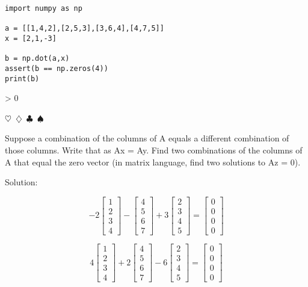 \documentclass{article}
\newcommand{\sep}{\begin{center}$\heartsuit$~$\diamondsuit$~$\clubsuit$~$\spadesuit$\end{center}}
\newcommand{\sol}{\begin{center}\small{Solution:}\end{center}}
\newcounter{prblm}
\newcommand{\problem}[1]{
  \begingroup
  \ifnum\value{prblm} > 0 \sep \fi
  \stepcounter{prblm}
  \noindent\textbf{\arabic{prblm}} #1
  \sol
  \endgroup
}
\begin{document}
\begin{verbatim}
import numpy as np

a = [[1,4,2],[2,5,3],[3,6,4],[4,7,5]]
x = [2,1,-3]

b = np.dot(a,x)
assert(b == np.zeros(4))
print(b)
\end{verbatim}


\problem{Suppose a combination of the columns of A equals a different combination of those columns. Write that as Ax = Ay. Find two combinations of the columns of A that
equal the zero vector (in matrix language, find two solutions to Az = 0).}


\begin{displaymath}
-2 \begin{bmatrix} 1 \\ 2 \\ 3 \\ 4 \end{bmatrix}
- \begin{bmatrix} 4 \\ 5 \\ 6 \\ 7 \end{bmatrix}
+ 3 \begin{bmatrix} 2 \\ 3 \\ 4 \\ 5 \end{bmatrix}
= \begin{bmatrix} 0 \\ 0 \\ 0 \\ 0 \end{bmatrix}
\end{displaymath}

\begin{displaymath}
4 \begin{bmatrix} 1 \\ 2 \\ 3 \\ 4 \end{bmatrix}
+ 2 \begin{bmatrix} 4 \\ 5 \\ 6 \\ 7 \end{bmatrix}
- 6 \begin{bmatrix} 2 \\ 3 \\ 4 \\ 5 \end{bmatrix}
= \begin{bmatrix} 0 \\ 0 \\ 0 \\ 0 \end{bmatrix}
\end{displaymath}
\end{document}
